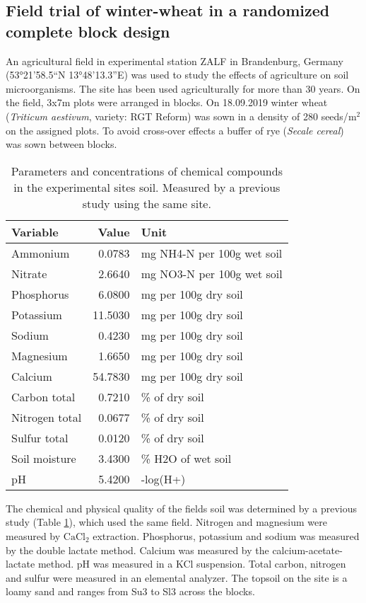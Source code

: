 \documentclass[twoside,12pt,final]{ucthesis-CA2012}
\begin{document}
\begin{ucmainmatter}
{\subsection{Field trial of winter-wheat in a randomized complete block design}\label{field-trial-of-winter-wheat-in-a-randomized-complete-block-design}}

An agricultural field in experimental station ZALF in Brandenburg, Germany (53°21'58.5``N 13°48'13.3''E) was used to study the effects of agriculture on soil microorganisms. The site has been used agriculturally for more than 30 years. On the field, 3x7m plots were arranged in blocks. On 18.09.2019 winter wheat (\emph{Triticum aestivum}, variety: RGT Reform) was sown in a density of 280 seeds/\(\mathrm{m^2}\) on the assigned plots. To avoid cross-over effects a buffer of rye (\emph{Secale cereal}) was sown between blocks.
\begin{table}

\caption{\label{tab:soilParameters}Parameters and concentrations of chemical compounds in the experimental sites soil. Measured by a previous study using the same site.}
\centering
\begin{tabular}[t]{lrl}
\toprule
Variable & Value & Unit\\
\midrule
Ammonium & 0.0783 & mg NH4-N per 100g wet soil\\
Nitrate & 2.6640 & mg NO3-N per 100g wet soil\\
Phosphorus & 6.0800 & mg per 100g dry soil\\
Potassium & 11.5030 & mg per 100g dry soil\\
Sodium & 0.4230 & mg per 100g dry soil\\
\addlinespace
Magnesium & 1.6650 & mg per 100g dry soil\\
Calcium & 54.7830 & mg per 100g dry soil\\
Carbon total & 0.7210 & \% of dry soil\\
Nitrogen total & 0.0677 & \% of dry soil\\
Sulfur total & 0.0120 & \% of dry soil\\
\addlinespace
Soil moisture & 3.4300 & \% H2O of wet soil\\
pH & 5.4200 & -log(H+)\\
\bottomrule
\end{tabular}
\end{table}
The chemical and physical quality of the fields soil was determined by a previous study (Table \ref{tab:soilParameters}), which used the same field. Nitrogen and magnesium were measured by \(\mathrm{CaCl_2}\) extraction. Phosphorus, potassium and sodium was measured by the double lactate method. Calcium was measured by the calcium-acetate-lactate method. pH was measured in a KCl suspension. Total carbon, nitrogen and sulfur were measured in an elemental analyzer. The topsoil on the site is a loamy sand and ranges from Su3 to Sl3 across the blocks.


\end{ucmainmatter}
\end{document}
